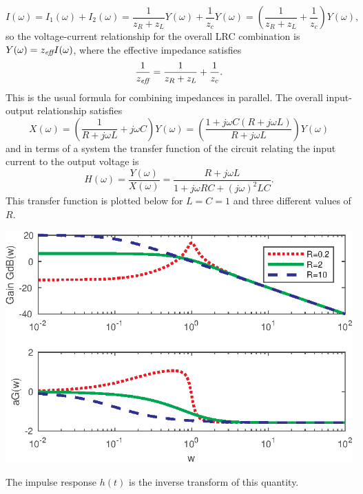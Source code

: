 \documentclass[10pt]{beamer}
\begin{document}
\begin{equation*}
  I(\omega) = I_1(\omega) + I_2(\omega) = \frac{1}{z_R + z_L} Y(\omega) + \frac{1}{z_c} Y(\omega)
  = \left( \frac{1}{z_R + z_L} + \frac{1}{z_c} \right) Y(\omega),
\end{equation*}
so the voltage-current relationship for the overall LRC combination is $Y(\omega) = z_\text{\it eff} I(\omega)$, where the effective impedance satisfies
\begin{equation*}
  \frac{1}{z_\text{\it eff}} = \frac{1}{z_R + z_L} + \frac{1}{z_c}.
\end{equation*}
This is the usual formula for combining impedances in parallel.  The overall input-output relationship satisfies
\begin{equation*}
  X(\omega) = \left( \frac{1}{R + j \omega L} + j \omega C \right) Y(\omega) 
  = \left( \frac{1 + j \omega C(R + j \omega L)}{R + j \omega L} \right) Y(\omega) 
\end{equation*}
and in terms of a system the transfer function of the circuit relating the input current to the output voltage is
\begin{equation*}
  H(\omega) = \frac{Y(\omega)}{X(\omega)} = \frac{R + j \omega L}{1 + j \omega RC + (j \omega)^2 LC}.
\end{equation*}
This transfer function is plotted below for $L=C=1$ and three different values of $R$.
\begin{center}
  \includegraphics{rlcbpfreqresp}
\end{center}
The impulse response $h(t)$ is the inverse transform of this quantity.
\end{document}
